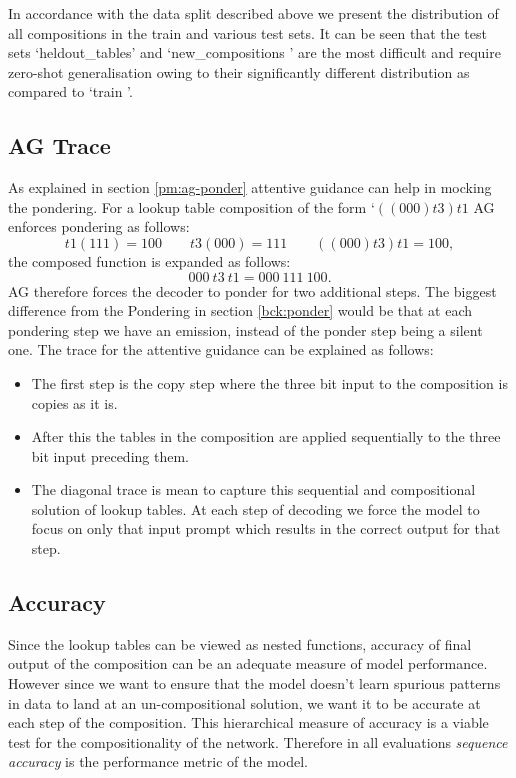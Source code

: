 In accordance with the data split described above we present the distribution of all compositions in the train and various test sets. It can be seen that the test sets \lq heldout\_tables\rq{} and \lq new\_compositions \rq{} are the most difficult and require zero-shot generalisation owing to their significantly different distribution as compared to \lq train \rq{}.

\subsection{AG Trace}\label{lt:ponder}
As explained in section \ref{pm:ag-ponder} attentive guidance can help in mocking the pondering. For a lookup table composition of the form \lq $((000)t3)t1$ AG enforces pondering as follows:
\begin{equation}
t1(111) = 100 \qquad t3(000) = 111 \qquad ((000)t3)t1 = 100,
\end{equation}
the composed function is expanded as follows:
\begin{equation}
000\ t3\ t1 = 000\ 111\ 100.
\end{equation}
AG therefore forces the decoder to ponder for two additional steps. The biggest difference from the Pondering in section \ref{bck:ponder} would be that at each pondering step we have an emission, instead of the ponder step being a silent one. The trace for the attentive guidance can be explained as follows:
\begin{itemize}
	\item The first step is the copy step where the three bit input to the composition is copies as it is.
	\item After this the tables in the composition are applied sequentially to the three bit input preceding them.
	\item The diagonal trace is mean to capture this sequential and compositional solution of lookup tables. At each step of decoding we force the model to focus on only that input prompt which results in the correct output for that step.
\end{itemize}


\subsection{Accuracy}
Since the lookup tables can be viewed as nested functions, accuracy of final output of the composition can be an adequate measure of model performance. However since we want to ensure that the model doesn't learn spurious patterns in data to land at an un-compositional solution, we want it to be accurate at each step of the composition. This hierarchical measure of accuracy is a viable test for the compositionality of the network. Therefore in all evaluations \textit{sequence accuracy} is the performance metric of the model.


